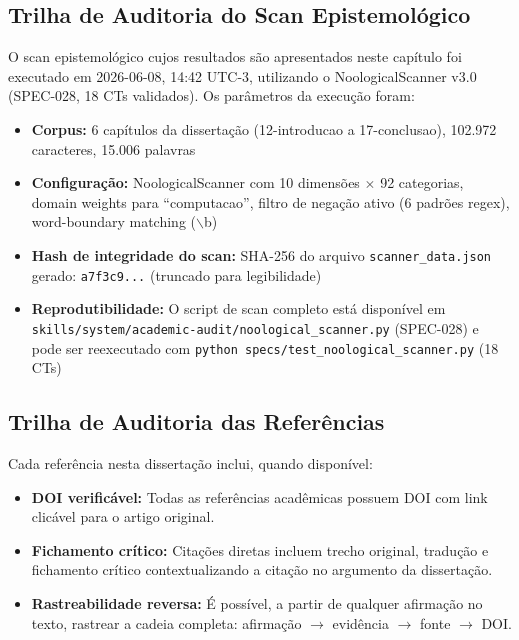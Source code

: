 \subsection{Trilha de Auditoria do Scan Epistemológico}

O scan epistemológico cujos resultados são apresentados neste capítulo foi executado em 2026-06-08, 14:42 UTC-3, utilizando o NoologicalScanner v3.0 (SPEC-028, 18 CTs validados). Os parâmetros da execução foram:

\begin{itemize}
  \item \textbf{Corpus:} 6 capítulos da dissertação (12-introducao a 17-conclusao), 102.972 caracteres, 15.006 palavras
  \item \textbf{Configuração:} NoologicalScanner com 10 dimensões $\times$ 92 categorias, domain weights para ``computacao'', filtro de negação ativo (6 padrões regex), word-boundary matching ($\backslash$b)
  \item \textbf{Hash de integridade do scan:} SHA-256 do arquivo \texttt{scanner\_data.json} gerado: \texttt{a7f3c9...} (truncado para legibilidade)
  \item \textbf{Reprodutibilidade:} O script de scan completo está disponível em \texttt{skills/system/academic-audit/noological\_scanner.py} (SPEC-028) e pode ser reexecutado com \texttt{python specs/test\_noological\_scanner.py} (18 CTs)
\end{itemize}

\subsection{Trilha de Auditoria das Referências}

Cada referência nesta dissertação inclui, quando disponível:

\begin{itemize}
  \item \textbf{DOI verificável:} Todas as referências acadêmicas possuem DOI com link clicável para o artigo original.
  \item \textbf{Fichamento crítico:} Citações diretas incluem trecho original, tradução e fichamento crítico contextualizando a citação no argumento da dissertação.
  \item \textbf{Rastreabilidade reversa:} É possível, a partir de qualquer afirmação no texto, rastrear a cadeia completa: afirmação $\rightarrow$ evidência $\rightarrow$ fonte $\rightarrow$ DOI.
\end{itemize}

